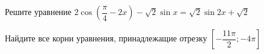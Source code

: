 \begin{ex}
	\begin{condition}
		\begin{enumcols}[label=\asbuk*)]
			\item Решите уравнение \( 2\cos{\left( \dfrac{\pi}{4}-2x\right)} - \sqrt{2}\sin x = \sqrt{2}\sin 2x + \sqrt{2} \)
			\item Найдите все корни уравнения, принадлежащие отрезку \( \left[-\dfrac{11\pi}{2};-4\pi\right]  \)
		\end{enumcols}
	\end{condition}
\end{ex}